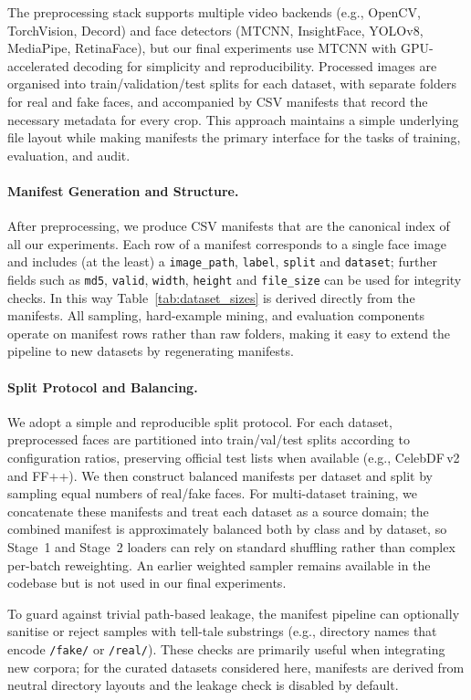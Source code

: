 The preprocessing stack supports multiple video backends (e.g., OpenCV, TorchVision, Decord) and face detectors (MTCNN, InsightFace, YOLOv8, MediaPipe, RetinaFace), but our final experiments use MTCNN with GPU\hyp accelerated decoding for simplicity and reproducibility. Processed images are organised into train/validation/test splits for each dataset, with separate folders for real and fake faces, and accompanied by CSV manifests that record the necessary metadata for every crop. This approach maintains a simple underlying file layout while making manifests the primary interface for the tasks of training, evaluation, and audit.

\paragraph{Manifest Generation and Structure.} After preprocessing, we produce CSV manifests that are the canonical index of all our experiments. Each row of a manifest corresponds to a single face image and includes (at the least) a \texttt{image\_path}, \texttt{label}, \texttt{split} and \texttt{dataset}; further fields such as \texttt{md5}, \texttt{valid}, \texttt{width}, \texttt{height} and \texttt{file\_size} can be used for integrity checks. In this way Table~\ref{tab:dataset_sizes} is derived directly from the manifests. All sampling, hard\hyp example mining, and evaluation components operate on manifest rows rather than raw folders, making it easy to extend the pipeline to new datasets by regenerating manifests.

\paragraph{Split Protocol and Balancing.} We adopt a simple and reproducible split protocol. For each dataset, preprocessed faces are partitioned into train/val/test splits according to configuration ratios, preserving official test lists when available (e.g., CelebDF\,v2 and FF++). We then construct balanced manifests per dataset and split by sampling equal numbers of real/fake faces. For multi\hyp dataset training, we concatenate these manifests and treat each dataset as a source domain; the combined manifest is approximately balanced both by class and by dataset, so Stage~1 and Stage~2 loaders can rely on standard shuffling rather than complex per\hyp batch reweighting. An earlier weighted sampler remains available in the codebase but is not used in our final experiments.

To guard against trivial path\hyp based leakage, the manifest pipeline can optionally sanitise or reject samples with tell\hyp tale substrings (e.g., directory names that encode \verb|/fake/| or \verb|/real/|). These checks are primarily useful when integrating new corpora; for the curated datasets considered here, manifests are derived from neutral directory layouts and the leakage check is disabled by default.

